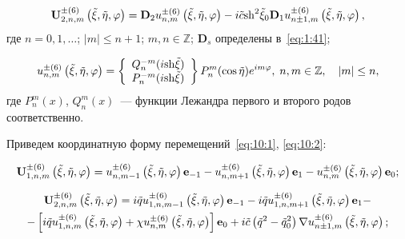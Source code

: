 \begin{equation}
{\bf{U}}_{2,n,m}^{ \pm (6)}\left( {\tilde \xi ,\tilde \eta ,\varphi } \right) = {{\bf{D}}_2}u_{n,m}^{ \pm (6)}\left( {\tilde \xi ,\tilde \eta ,\varphi } \right) - i\tilde c{{\mathop{\rm sh}\nolimits} ^2}{\tilde \xi _0}{{\bf{D}}_1}u_{n \pm 1,m}^{ \pm (6)}\left( {\tilde \xi ,\tilde \eta ,\varphi } \right),
\label{eq:10:2}
\end{equation}
где $n=0,1,\dots$; $|m|\le n+1$; $m,n\in\mathbb{Z}$; $\mathbf{D}_s$ определены в~\eqref{eq:1:41};

\begin{equation}
u_{n,m}^{ \pm (6)}\left( {\tilde \xi ,\tilde \eta ,\varphi } \right) = \left\{ \begin{array}{l}
Q_n^{ - m}(i{\mathop{\rm sh}\nolimits} \tilde \xi )\\
P_n^{ - m}(i{\mathop{\rm sh}\nolimits} \tilde \xi )
\end{array} \right\}P_n^m(\cos \tilde \eta ){e^{im\varphi }},\,{\kern 1pt} n,m \in\mathbb{Z} ,\quad |m| \le n,
\end{equation}
где $P_n^m(x)$, $Q_n^m(x)$~--- функции Лежандра первого и второго родов соответственно.

Приведем координатную форму перемещений~\eqref{eq:10:1}, \eqref{eq:10:2}:

\begin{equation}
{\bf{U}}_{1,n,m}^{ \pm (6)}\left( {\tilde \xi ,\tilde \eta ,\varphi } \right) = u_{n,m - 1}^{ \pm (6)}\left( {\tilde \xi ,\tilde \eta ,\varphi } \right){{\bf{e}}_{ - 1}} - u_{n,m + 1}^{ \pm (6)}\left( {\tilde \xi ,\tilde \eta ,\varphi } \right){{\bf{e}}_1} - u_{n,m}^{ \pm (6)}\left( {\tilde \xi ,\tilde \eta ,\varphi } \right){{\bf{e}}_0};
\end{equation}

\begin{multline}
{\bf{U}}_{2,n,m}^{ \pm (6)}\left( {\tilde \xi ,\tilde \eta ,\varphi } \right) = i\tilde qu_{1,n,m - 1}^{ \pm (6)}\left( {\tilde \xi ,\tilde \eta ,\varphi } \right){{\bf{e}}_{ - 1}} - i\tilde qu_{1,n,m + 1}^{ \pm (6)}\left( {\tilde \xi ,\tilde \eta ,\varphi } \right){{\bf{e}}_1} - \\
- \left[ {i\tilde qu_{1,n,m}^{ \pm (6)}\left( {\tilde \xi ,\tilde \eta ,\varphi } \right) + \chi u_{n,m}^{ \pm (6)}\left( {\tilde \xi ,\tilde \eta ,\varphi } \right)} \right]{{\bf{e}}_0} + i\tilde c\left( {{{\tilde q}^2} - \tilde q_0^2} \right)\nabla u_{n \pm 1,m}^{ \pm (6)}\left( {\tilde \xi ,\tilde \eta ,\varphi } \right);
\end{multline}


